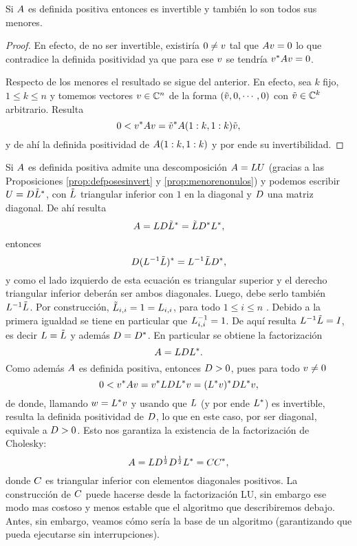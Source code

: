\begin{tcolorbox}
\begin{prop}
\label{prop:defposesinvert}
Si $\Ab$ es definida positiva entonces es invertible y también lo son todos sus menores.
\end{prop}
\begin{proof}
 En efecto, de no ser invertible, existiría $\cero\neq\vb$ tal que
 $\Ab\vb=\cero$ lo que contradice la definida positividad ya que para ese $\vb$ se tendría $\vb^*\Ab\vb=0$.

 Respecto de los menores el resultado se sigue del anterior. En efecto, sea $k$ fijo, $1\le k\le n$ y tomemos
 vectores $\vb\in \C^n$ de la forma
 $(\tilde \vb,0,\cdots,0)$ con $\tilde \vb \in \C^k$ arbitrario. Resulta
 $$
 0<\vb^*\Ab\vb=\tilde\vb^*\Ab(1:k,1:k)\tilde \vb,
 $$
 y de ahí la definida positividad de $\Ab(1:k,1:k)$ y por ende su invertibilidad.
\end{proof}


Si $\Ab$ es definida positiva  admite una descomposición $\Ab=\Lb\Ub$ (gracias a las Proposiciones \ref{prop:defposesinvert} y \ref{prop:menorenonulos}) y
podemos escribir  $\Ub=\Db\tilde \Lb^*$, con $\tilde \Lb$ triangular inferior con $1$ en la diagonal y $\Db$ una matriz diagonal. De ahí resulta
$$
\Ab=\Lb\Db\tilde{ \Lb}^*=\tilde \Lb\Db^*\Lb^*,
$$
entonces
$$
\Db(\Lb^{-1}\tilde{ \Lb})^* = \Lb^{-1}\tilde \Lb\Db^*,
$$
y como el lado izquierdo de esta ecuación es triangular superior y el derecho triangular inferior deberán ser ambos diagonales. Luego, debe serlo también $\Lb^{-1}\tilde \Lb$. Por  construcción, $\tilde\Lb_{i,i}=1=\Lb_{i,i}$, para todo $1\le i\le n$ . Debido a la primera igualdad se tiene en particular que
$\Lb^{-1}_{i,i}=1$. De aquí resulta
$\Lb^{-1}\tilde \Lb=\Ib$, es decir
$\Lb=\tilde \Lb$ y además $\Db=\Db^*$.
En particular se obtiene la factorización
$$
\Ab=\Lb\Db\Lb^*.
$$
Como además $\Ab$ es definida positiva, entonces $\Db>0$, pues para todo $\vb\neq 0$
$$
0<\vb^*\Ab\vb=\vb^*\Lb\Db\Lb^*\vb=
(\Lb^*\vb)^*\Db\Lb^*\vb,
$$
de donde, llamando $\wb=\Lb^*\vb$ y usando que $\Lb$ (y por ende $\Lb^*$) es invertible, resulta la definida positividad de $\Db$, lo que en este caso, por ser diagonal, equivale a $\Db>0$. Esto nos garantiza la existencia de la factorización de Cholesky:
$$
\Ab=\Lb\Db^{\frac{1}{2}}\Db^{\frac{1}{2}}\Lb^*=\Cb\Cb^*,
$$
donde $\Cb$ es triangular inferior con elementos diagonales positivos. La construcción de $\Cb$ puede hacerse desde la factorización LU, sin embargo
ese modo mas costoso y menos estable que el algoritmo que describiremos debajo. Antes, sin embargo, veamos cómo sería la base de un algoritmo (garantizando que pueda ejecutarse sin interrupciones).


\end{tcolorbox}
